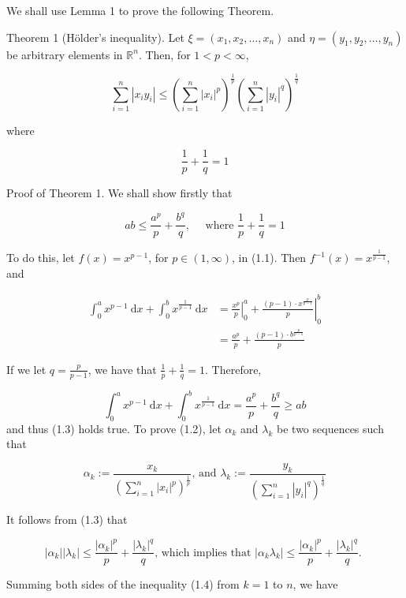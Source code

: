 \documentclass{article}
\begin{document}
We shall use Lemma 1 to prove the following Theorem.

Theorem 1 (Hölder's inequality). Let $\xi=\left(x_{1}, x_{2}, \ldots, x_{n}\right)$ and $\eta=\left(y_{1}, y_{2}, \ldots, y_{n}\right)$ be arbitrary elements in $\mathbb{R}^{n}$. Then, for $1<p<\infty$,

$$
\sum_{i=1}^{n}\left|x_{i} y_{i}\right| \leq\left(\sum_{i=1}^{n}\left|x_{i}\right|^{p}\right)^{\frac{1}{p}}\left(\sum_{i=1}^{n}\left|y_{i}\right|^{q}\right)^{\frac{1}{q}}
$$

where

$$
\frac{1}{p}+\frac{1}{q}=1
$$

Proof of Theorem 1. We shall show firstly that

$$
a b \leq \frac{a^{p}}{p}+\frac{b^{q}}{q}, \quad \text { where } \frac{1}{p}+\frac{1}{q}=1
$$

To do this, let $f(x)=x^{p-1}$, for $p \in(1, \infty)$, in (1.1). Then $f^{-1}(x)=x^{\frac{1}{p-1}}$, and

$$
\begin{aligned}
\int_{0}^{a} x^{p-1} \mathrm{~d} x+\int_{0}^{b} x^{\frac{1}{p-1}} \mathrm{~d} x & =\left.\frac{x^{p}}{p}\right|_{0} ^{a}+\left.\frac{(p-1) \cdot x^{\frac{p}{p-1}}}{p}\right|_{0} ^{b} \\
& =\frac{a^{p}}{p}+\frac{(p-1) \cdot b^{\frac{p}{p-1}}}{p}
\end{aligned}
$$

If we let $q=\frac{p}{p-1}$, we have that $\frac{1}{p}+\frac{1}{q}=1$. Therefore,

$$
\int_{0}^{a} x^{p-1} \mathrm{~d} x+\int_{0}^{b} x^{\frac{1}{p-1}} \mathrm{~d} x=\frac{a^{p}}{p}+\frac{b^{q}}{q} \geq a b
$$
and thus (1.3) holds true. To prove (1.2), let $\alpha_{k}$ and $\lambda_{k}$ be two sequences such that

$$
\alpha_{k}:=\frac{x_{k}}{\left(\sum_{i=1}^{n}\left|x_{i}\right|^{p}\right)^{\frac{1}{p}}} \text {, and } \lambda_{k}:=\frac{y_{k}}{\left(\sum_{i=1}^{n}\left|y_{i}\right|^{q}\right)^{\frac{1}{q}}}
$$

It follows from (1.3) that

$$
\left|\alpha_{k}\right|\left|\lambda_{k}\right| \leq \frac{\left|\alpha_{k}\right|^{p}}{p}+\frac{\left|\lambda_{k}\right|^{q}}{q} \text {, which implies that }\left|\alpha_{k} \lambda_{k}\right| \leq \frac{\left|\alpha_{k}\right|^{p}}{p}+\frac{\left|\lambda_{k}\right|^{q}}{q} \text {. }
$$

Summing both sides of the inequality (1.4) from $k=1$ to $n$, we have
\end{document}
